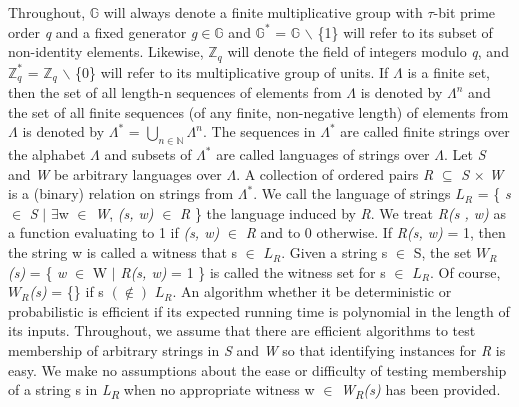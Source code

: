\documentclass[a4paper]{article}
\begin{document}
Throughout, $\mathbb{G}$ will always denote a finite multiplicative group with  \(\tau\)-bit prime order \emph{q} and a fixed generator \emph{g}\(\in\)$\mathbb{G}$ and $\mathbb{G}^{*}$ = $\mathbb{G}$ \ensuremath{\backslash} \{1\} will refer to its subset of non-identity elements. Likewise, $\mathbb{Z}_q$ will denote the field of integers modulo \emph{q}, and $\mathbb{Z}^{*}_q$ = $\mathbb{Z}_q$ \ensuremath{\backslash} \{0\} will refer to its multiplicative group of units.
\newline
\newline
If \(\Lambda\) is a finite set, then the set of all length-n sequences of elements from \(\Lambda\) is denoted by \(\Lambda^n\) and the set of all finite sequences (of any finite, non-negative length) of elements from \(\Lambda\) is denoted by \(\Lambda^{*}\) = \( \bigcup_{n\in\mathbb{N}} \)\(\Lambda^n\). The sequences in \(\Lambda^{*}\) are called finite strings over the alphabet \(\Lambda\) and subsets of \(\Lambda^{*}\) are called languages of strings over \(\Lambda\). Let \textit{S} and \textit{W} be arbitrary languages over \(\Lambda\). A collection of ordered pairs \textit{R} \(\subseteq\) \textit{S} \(\times\) \textit{W} is a (binary) relation on strings from \(\Lambda^{*}\). We call the language of strings \textit{$L_R$} {=} \{ \textit{s} $\in$ \textit{S} \(\mid\) \(\exists\)w $\in$ \textit{W}, \textit{(s, w)} $\in$ \textit{R} \} the language induced by \textit{R}. We treat \textit{R(s , w)} as a function evaluating to 1 if \textit{(s, w)} $\in$ \textit{R} and to 0 otherwise. If \textit{R(s, w)} = 1, then the string w is called a witness that s $\in$ \textit{$L_R$}. Given a string s $\in$ S, the set \textit{$W_R$(s)} = \{ \textit{w} $\in$ W $\mid$ \textit{R(s, w)} = 1 \}  is called the witness set for s $\in$ \textit{$L_R$}. Of course, \textit{$W_R$(s)} = \{\} if s $(\notin)$ \textit{$L_R$}.
\newline
An algorithm whether it be deterministic or probabilistic is efficient if its expected running time is polynomial in the length of its inputs.
\newline
Throughout, we assume that there are efficient algorithms to test membership of arbitrary strings in \textit{S} and \textit{W} so that identifying instances for \textit{R} is easy. 
\newline
We make no assumptions about the ease or difficulty of testing membership of a string s in \textit{L\textsubscript{R}} when no appropriate witness w $\in$ \textit{W\textsubscript{R}(s)} has been provided.
\newline
\end{document}
